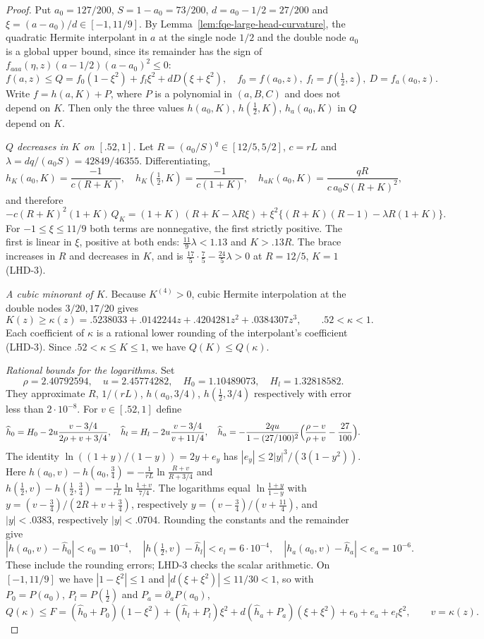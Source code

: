 \begin{proof}
Put $a_0=127/200$, $S=1-a_0=73/200$, $d=a_0-1/2=27/200$ and $\xi=(a-a_0)/d\in[-1,11/9]$.
By Lemma~\ref{lem:fqe-large-head-curvature}, the quadratic Hermite interpolant in $a$
at the single node $1/2$ and the double node $a_0$ is a global upper bound,
since its remainder has the sign of $f_{aaa}(\eta,z)(a-1/2)(a-a_0)^2\le0$:
\[
 f(a,z)\le Q=f_0(1-\xi^2)+f_l\xi^2+dD(\xi+\xi^2),\quad
 f_0=f(a_0,z),\ f_l=f(\tfrac12,z),\ D=f_a(a_0,z).
\]
Write $f=h(a,K)+P$, where $P$ is a polynomial in $(a,B,C)$ and does not depend on $K$.
Then only the three values $h(a_0,K)$, $h(\tfrac12,K)$, $h_a(a_0,K)$ in $Q$ depend on $K$.

\emph{$Q$ decreases in $K$ on $[.52,1]$.}
Let $R=(a_0/S)^q\in[12/5,5/2]$, $c=rL$ and $\lambda=dq/(a_0S)=42849/46355$.
Differentiating,
\[
 h_K(a_0,K)=\frac{-1}{c(R+K)},\quad h_K(\tfrac12,K)=\frac{-1}{c(1+K)},\quad
 h_{aK}(a_0,K)=\frac{qR}{c\,a_0S(R+K)^2},
\]
and therefore
\[
 -c(R+K)^2(1+K)\,Q_K=(1+K)\,(R+K-\lambda R\xi)+\xi^2\{(R+K)(R-1)-\lambda R(1+K)\}.
\]
For $-1\le\xi\le11/9$ both terms are nonnegative, the first strictly positive. The first is linear in $\xi$, positive at both ends:
$\frac{11}9\lambda<1.13$ and $K>.13R$. The brace increases in $R$ and decreases in $K$, and is
$\frac{17}5\cdot\frac75-\frac{24}5\lambda>0$ at $R=12/5$, $K=1$ (LHD-3).

\emph{A cubic minorant of $K$.}
Because $K^{(4)}>0$, cubic Hermite interpolation at the double nodes $3/20,17/20$ gives
\[
 K(z)\ge\kappa(z)=.5238033+.0142244z+.4204281z^2+.0384307z^3,
 \qquad .52<\kappa<1.                                      \tag{LH1}
\]
Each coefficient of $\kappa$ is a rational lower rounding of the interpolant's coefficient (LHD-3).
Since $.52<\kappa\le K\le1$, we have $Q(K)\le Q(\kappa)$.

\emph{Rational bounds for the logarithms.} Set
\[
 \rho=2.40792594,\quad u=2.45774282,\quad H_0=1.10489073,\quad H_l=1.32818582.
\]
They approximate $R$, $1/(rL)$, $h(a_0,3/4)$, $h(\tfrac12,3/4)$ respectively with error less than $2\cdot10^{-8}$.
For $v\in[.52,1]$ define
\[
 \widehat h_0=H_0-2u\frac{v-3/4}{2\rho+v+3/4},\quad
 \widehat h_l=H_l-2u\frac{v-3/4}{v+11/4},\quad
 \widehat h_a=-\frac{2qu}{1-(27/100)^2}\Bigl(\frac{\rho-v}{\rho+v}-\frac{27}{100}\Bigr).
\]
The identity $\ln((1+y)/(1-y))=2y+e_y$ has $|e_y|\le2|y|^3/(3(1-y^2))$.
Here $h(a_0,v)-h(a_0,\tfrac34)=-\frac1{rL}\ln\frac{R+v}{R+3/4}$ and
$h(\tfrac12,v)-h(\tfrac12,\tfrac34)=-\frac1{rL}\ln\frac{1+v}{7/4}$. The logarithms equal $\ln\frac{1+y}{1-y}$ with
$y=(v-\frac34)/(2R+v+\frac34)$, respectively $y=(v-\frac34)/(v+\frac{11}4)$, and $|y|<.0383$, respectively $|y|<.0704$.
Rounding the constants and the remainder give
\[
 |h(a_0,v)-\widehat h_0|<e_0=10^{-4},\quad
 |h(\tfrac12,v)-\widehat h_l|<e_l=6\cdot10^{-4},\quad
 |h_a(a_0,v)-\widehat h_a|<e_a=10^{-6}.                         \tag{LH2}
\]
These include the rounding errors; LHD-3 checks the scalar arithmetic.
On $[-1,11/9]$ we have $|1-\xi^2|\le1$ and $|d(\xi+\xi^2)|\le11/30<1$, so with
$P_0=P(a_0)$, $P_l=P(\tfrac12)$ and $P_a=\partial_aP(a_0)$,
\[
 Q(\kappa)\le F=(\widehat h_0+P_0)(1-\xi^2)+(\widehat h_l+P_l)\xi^2+d(\widehat h_a+P_a)(\xi+\xi^2)
   +e_0+e_a+e_l\xi^2,\qquad v=\kappa(z).
\]


\end{proof}
